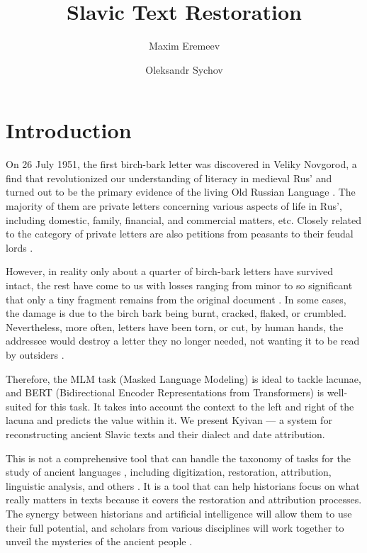 \documentclass{article}
\title{Slavic Text Restoration}
\author{Maxim Eremeev \and Oleksandr Sychov}
\date{}
\begin{document}
\maketitle

\section{Introduction}
\label{sec:intro}
On 26 July 1951, the first birch-bark letter was discovered in Veliky Novgorod, a find that revolutionized our understanding of literacy in medieval Rus' and turned out to be the primary evidence of the living Old Russian Language \cite{zaliznyak2004}. The majority of them are private letters concerning various aspects of life in Rus', including domestic, family, financial, and commercial matters, etc. Closely related to the category of private letters are also petitions from peasants to their feudal lords \cite{zaliznyak2004}.

However, in reality only about a quarter of birch-bark letters have survived intact, the rest have come to us with losses ranging from minor to so significant that only a tiny fragment remains from the original document \cite{zaliznyak2004}. In some cases, the damage is due to the birch bark being burnt, cracked, flaked, or crumbled. Nevertheless, more often, letters have been torn, or cut, by human hands, the addressee would destroy a letter they no longer needed, not wanting it to be read by outsiders \cite{zaliznyak2004}.

Therefore, the MLM task (Masked Language Modeling) is ideal to tackle lacunae, and BERT (Bidirectional Encoder Representations from Transformers) \cite{devlin2018} is well-suited for this task. It takes into account the context to the left and right of the lacuna and predicts the value within it. We present Kyivan — a system for reconstructing ancient Slavic texts and their dialect and date attribution.

This is not a comprehensive tool that can handle the taxonomy of tasks for the study of ancient languages \cite{sommerschield2023}, including digitization, restoration, attribution, linguistic analysis, and others \cite{sommerschield2023}. It is a tool that can help historians focus on what really matters in texts because it covers the restoration and attribution processes. The synergy between historians and artificial intelligence will allow them to use their full potential, and scholars from various disciplines will work together to unveil the mysteries of the ancient people \cite{assael2022,assael2025}.
\end{document}
